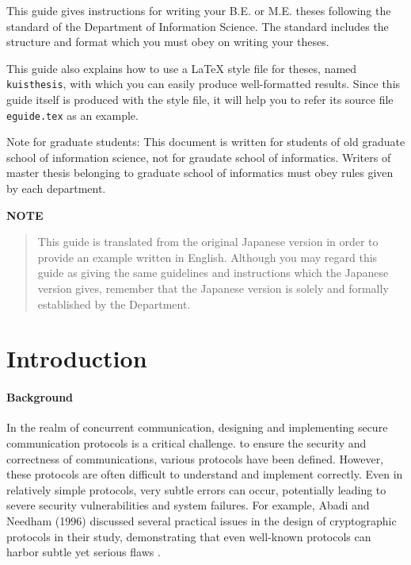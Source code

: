 \documentclass[master,english]{kuisthesis}
\date{February 12th, 2019}
\begin{document}
\maketitle					%

\begin{eabstract}				%
This guide gives instructions for writing your B.E. or M.E. theses following
the standard of the Department of Information Science.  The
standard includes the structure and format which you must obey on writing
your theses.

This guide also explains how to use a \LaTeX{} style file for theses, named
\verb|kuisthesis|, with which you can easily produce well-formatted results.
Since this guide itself is produced with the style file, it will help you to
refer its source file \verb|eguide.tex| as an example.

Note for graduate students: This document is written for students of
old graduate school of information science, not for graudate school of
informatics. Writers of master thesis belonging to graduate school
of informatics must obey rules given by each department.

\par\bigskip\centerline{\bf NOTE}
\begin{quote}
  This guide is translated from the original Japanese version in order
  to provide an example written in English.  Although you may regard
  this guide as giving the same guidelines and instructions which the
  Japanese version gives, remember that the Japanese version is solely
  and formally established by the Department.
\end{quote}
\end{eabstract}



\tableofcontents				%

\section{Introduction}\label{sec-intro}	

\paragraph{Background}

In the realm of concurrent communication, designing and implementing secure communication protocols is a critical challenge. to ensure the security and correctness of communications, various protocols have been defined. However, these protocols are often difficult to understand and implement correctly. Even in relatively simple protocols, very subtle errors can occur, potentially leading to severe security vulnerabilities and system failures. For example, Abadi and Needham (1996) discussed several practical issues in the design of cryptographic protocols in their study, demonstrating that even well-known protocols can harbor subtle yet serious flaws \cite{?}.
\end{document}
